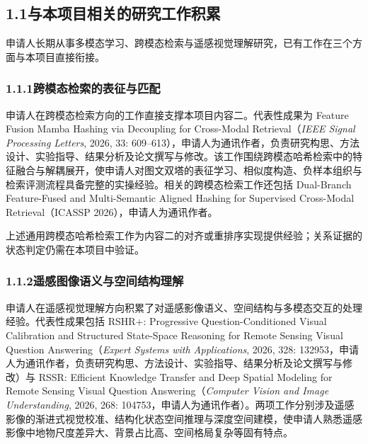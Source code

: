 
\subsection*{1.1\quad 与本项目相关的研究工作积累}

申请人长期从事多模态学习、跨模态检索与遥感视觉理解研究，已有工作在三个方面与本项目直接衔接。

\subsubsection*{1.1.1\quad 跨模态检索的表征与匹配}

申请人在跨模态检索方向的工作直接支撑本项目内容二。代表性成果为 Feature Fusion Mamba Hashing via Decoupling for Cross-Modal Retrieval（\textit{IEEE Signal Processing Letters}, 2026, 33: 609--613），申请人为通讯作者，负责研究构思、方法设计、实验指导、结果分析及论文撰写与修改。该工作围绕跨模态哈希检索中的特征融合与解耦展开，使申请人对图文双塔的表征学习、相似度构造、负样本组织与检索评测流程具备完整的实操经验。相关的跨模态检索工作还包括 Dual-Branch Feature-Fused and Multi-Semantic Aligned Hashing for Supervised Cross-Modal Retrieval（ICASSP 2026），申请人为通讯作者。

上述通用跨模态哈希检索工作为内容二的对齐或重排序实现提供经验；关系证据的状态判定仍需在本项目中验证。

\subsubsection*{1.1.2\quad 遥感图像语义与空间结构理解}

申请人在遥感视觉理解方向积累了对遥感影像语义、空间结构与多模态交互的处理经验。代表性成果包括 RSHR+: Progressive Question-Conditioned Visual Calibration and Structured State-Space Reasoning for Remote Sensing Visual Question Answering（\textit{Expert Systems with Applications}, 2026, 328: 132953，申请人为通讯作者，负责研究构思、方法设计、实验指导、结果分析及论文撰写与修改）与 RSSR: Efficient Knowledge Transfer and Deep Spatial Modeling for Remote Sensing Visual Question Answering（\textit{Computer Vision and Image Understanding}, 2026, 268: 104753，申请人为通讯作者）。两项工作分别涉及遥感影像的渐进式视觉校准、结构化状态空间推理与深度空间建模，使申请人熟悉遥感影像中地物尺度差异大、背景占比高、空间格局复杂等固有特点。

